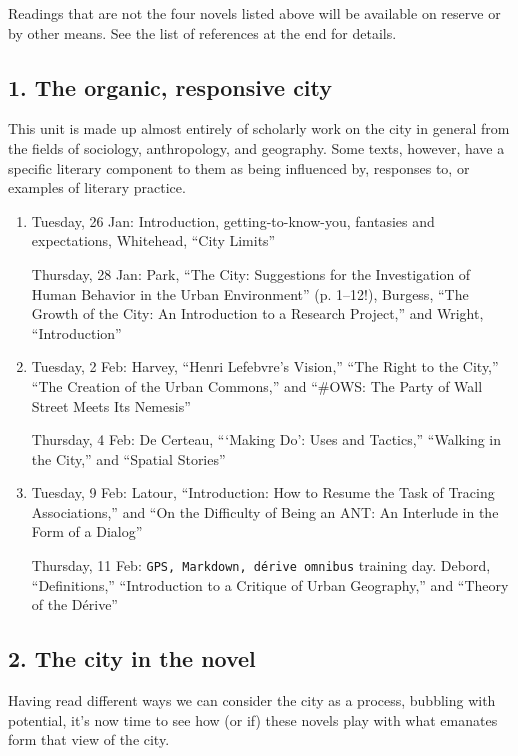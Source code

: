 Readings that are not the four novels listed above will be available on reserve
or by other means. See the list of references at the end for details.

\subsection*{1. The organic, responsive city}

  This unit is made up almost entirely of scholarly work on the city in general
  from the fields of sociology, anthropology, and geography. Some texts,
  however, have a specific literary component to them as being influenced by,
  responses to, or examples of literary practice. 

\begin{enumerate}

  \item Tuesday, 26 Jan: Introduction, getting-to-know-you, fantasies and expectations,
    Whitehead, “City Limits”

    Thursday, 28 Jan: Park, “The City: Suggestions for the Investigation of Human Behavior in the Urban Environment” (p. 1--12!), Burgess, “The Growth of the City: An Introduction to a Research Project,” and Wright, “Introduction”

  \item Tuesday, 2 Feb: Harvey, “Henri Lefebvre’s Vision,” “The Right to the City,” “The Creation of the Urban Commons,” and “\#OWS: The Party of Wall Street Meets Its Nemesis”

    Thursday, 4 Feb: De Certeau, “‘Making Do’: Uses and Tactics,” “Walking in the City,” and “Spatial Stories”

  \item Tuesday, 9 Feb: Latour, “Introduction: How to Resume the Task of Tracing Associations,” and “On the Difficulty of Being an ANT: An Interlude in the Form of a Dialog”

    Thursday, 11 Feb: \texttt{GPS, Markdown, dérive omnibus} training day. Debord, “Definitions,” “Introduction to a Critique of Urban Geography,” and “Theory of the Dérive”

\end{enumerate}

\subsection*{2. The city in the novel}

Having read different ways we can consider the city as a process, bubbling with
potential, it’s now time to see how (or if) these novels play with what
emanates form that view of the city.

